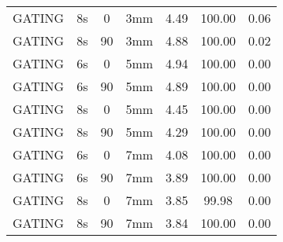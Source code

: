\begin{table}[H]
\begin{tabular}{|c||c|c|c||c|c|c|}
GATING & 8s & 0 & 3mm & 4.49 & 100.00 & 0.06 \\
GATING & 8s & 90 & 3mm & 4.88 & 100.00 & 0.02 \\
GATING & 6s & 0 & 5mm & 4.94 & 100.00 & 0.00 \\
GATING & 6s & 90 & 5mm & 4.89 & 100.00 & 0.00 \\
GATING & 8s & 0 & 5mm & 4.45 & 100.00 & 0.00 \\
GATING & 8s & 90 & 5mm & 4.29 & 100.00 & 0.00 \\
GATING & 6s & 0 & 7mm & 4.08 & 100.00 & 0.00 \\
GATING & 6s & 90 & 7mm & 3.89 & 100.00 & 0.00 \\
GATING & 8s & 0 & 7mm & 3.85 & 99.98 & 0.00 \\
GATING & 8s & 90 & 7mm & 3.84 & 100.00 & 0.00 \\
    \hline\hline 
  \end{tabular}
\end{table}


\newpage

